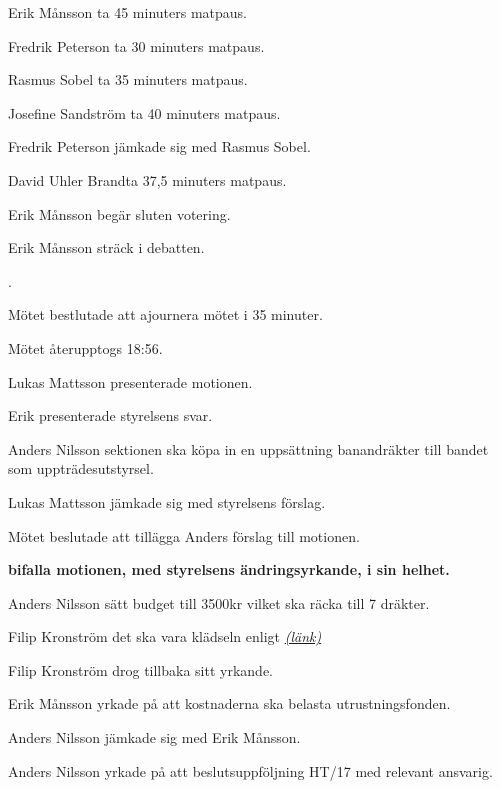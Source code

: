 \documentclass[10pt]{article}
\def\ji{David Uhler Brand}
\begin{document}
\begin{paragrafer}
\begin{paragrafer}
        Erik Månsson \ypa ta 45 minuters matpaus.

        Fredrik Peterson \ypa ta 30 minuters matpaus.

        Rasmus Sobel \ypa ta 35 minuters matpaus.

        Josefine Sandström \ypa ta 40 minuters matpaus.

        Fredrik Peterson jämkade sig med Rasmus Sobel.

        \ji  \ypa ta 37,5 minuters matpaus.

        Erik Månsson begär sluten votering.

        Erik Månsson \ypa sträck i debatten.

        \Mbaby.

        Mötet bestlutade att ajournera mötet i 35 minuter.

        Mötet återupptogs 18:56.
    \end{paragrafer}

        \begin{paragrafer}
          Lukas Mattsson presenterade motionen.

          Erik presenterade styrelsens svar.

          Anders Nilsson \ypa sektionen ska köpa in en uppsättning banandräkter till bandet som uppträdesutstyrsel.

          Lukas Mattsson jämkade sig med styrelsens förslag.

          Mötet beslutade att tillägga Anders förslag till motionen.

          \textbf{\Mba bifalla motionen, med styrelsens ändringsyrkande, i sin helhet.}

          Anders Nilsson \ypa sätt budget till 3500kr vilket ska räcka till 7 dräkter.

          Filip Kronström \ypa det ska vara klädseln enligt
          \href{http://www.ebay.com/itm/Willy-Adult-Unisex-Banana-Suits-Yellow-Costume-Light-Fruit-Party-Fancy-Dress-/152488835359?hash=item23810af91f:g:rA0AAOSwB-1Y2mCV}{\textit{(länk)}}

          Filip Kronström drog tillbaka sitt yrkande.

          Erik Månsson yrkade på att kostnaderna ska belasta utrustningsfonden.

          Anders Nilsson jämkade sig med Erik Månsson.

          Anders Nilsson yrkade på att beslutsuppföljning HT/17 med relevant ansvarig.


\end{paragrafer}
\end{paragrafer}
\end{document}
